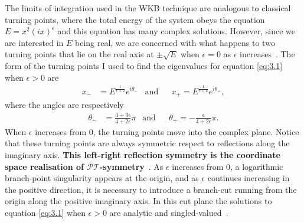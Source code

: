 \documentclass[12pt, a4paper]{report}
\newcommand\PT{\(\mathcal{PT}\)}
\begin{document}
The limits of integration used in the WKB technique are analogous to classical turning points, where the total energy of the system obeys the equation $E = x^2 (ix)^{\epsilon}$ and this equation has many complex solutions. However, since we are interested in $E$ being real, we are concerned with what happens to two turning points that lie on the real axis at $\pm \sqrt{E}$ when $\epsilon = 0$ as $\epsilon$ increases~\cite{PTsymmetricQM, MakingSense}.
The form of the turning points I used to find the eigenvalues for equation \ref{eq:3.1} when $\epsilon>0$ are
\begin{align}
x_{-}& = 
E^{\frac{1}{\epsilon + 2}}
e^{i\theta_{-}}
&\mathrm{and}&
&x_{+} = E^{\frac{1}{\epsilon + 2}} e^{i\theta_{+}},
\end{align}
where the angles are respectively
\begin{align}
\theta_{-}& = \frac{4 + 3\epsilon}{4 + 2 \epsilon} \pi
&\mathrm{and}&
&\theta_{+} = - \frac{\epsilon}{4 + 2 \epsilon} \pi.
\end{align}
When $\epsilon$ increases from 0, the turning points move into the complex plane. Notice that these turning points are always symmetric respect to reflections along the imaginary axis. \textbf{This left-right reflection symmetry is the coordinate space realisation of \PT-symmetry}~\cite{PTsymmetricQM}.
As $\epsilon$ increases from 0, a logarithmic branch-point singularity appears at the origin, and as $\epsilon$ continues increasing in the positive direction, it is necessary to introduce a branch-cut running from the origin along the positive imaginary axis. In this cut plane the solutions to equation \ref{eq:3.1} when $\epsilon>0$ are analytic and singled-valued~\cite{PTsymmetricQM}.
\end{document}

